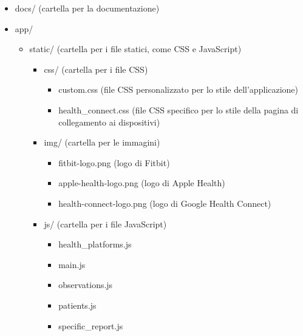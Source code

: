 \documentclass[12pt,a4paper,oneside]{report}
\begin{document}
\begin{itemize}
    \item docs/ (cartella per la documentazione)
    \item app/
          \begin{itemize}
              \item static/ (cartella per i file statici, come CSS e JavaScript)
                    \begin{itemize}
                        \item css/ (cartella per i file CSS)
                              \begin{itemize}
                                  \item custom.css (file CSS personalizzato per lo stile dell'applicazione)
                                  \item health\_connect.css (file CSS specifico per lo stile della pagina di collegamento ai dispositivi)
                              \end{itemize}
                    \end{itemize}
                    \begin{itemize}
                        \item img/ (cartella per le immagini)
                              \begin{itemize}
                                  \item fitbit-logo.png (logo di Fitbit)
                                  \item apple-health-logo.png (logo di Apple Health)
                                  \item health-connect-logo.png (logo di Google Health Connect)
                              \end{itemize}
                    \end{itemize}
                    \begin{itemize}
                        \item js/ (cartella per i file JavaScript)
                              \begin{itemize}
                                  \item health\_platforms.js
                                  \item main.js
                                  \item observations.js
                                  \item patients.js
                                  \item specific\_report.js

\end{itemize}
\end{itemize}
\end{itemize}
\end{itemize}
\end{document}
